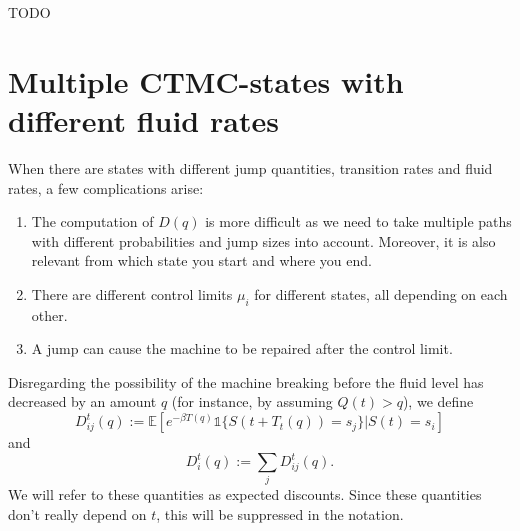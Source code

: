 TODO
\section{Multiple CTMC-states with different fluid rates}
When there are states with different jump quantities, transition rates and fluid rates, a few complications arise:
\begin{enumerate}
\item The computation of $D(q)$ is more difficult as we need to take multiple paths with different probabilities and jump sizes into account. Moreover, it is also relevant from which state you start and where you end.
\item There are different control limits $\mu_i$ for different states, all depending on each other.
\item A jump can cause the machine to be repaired after the control limit. 
\end{enumerate}

Disregarding the possibility of the machine breaking before the fluid level has decreased by an amount $q$ (for instance, by assuming $Q(t)>q$), we define 
$$D^{t}_{ij}(q):=\mathbb{E}[e^{-\beta T(q)}\mathds{1}\{S(t+T_t(q))=s_j\}|S(t)=s_i]$$
and
$$D^{t}_{i}(q):=\sum\limits_{j}D^{t}_{ij}(q).$$
We will refer to these quantities as expected discounts.
Since these quantities don't really depend on $t$, this will be suppressed in the notation.

